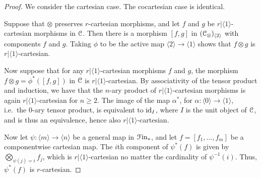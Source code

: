 \documentclass[main.tex]{subfiles}
\begin{document}
\begin{proof}
  We consider the cartesian case. The cocartesian case is identical.

  Suppose that $\otimes$ preserves $r$-cartesian morphisms, and let $f$ and $g$ be $r|\langle 1 \rangle$-cartesian morphisms in $\mathcal{C}$. Then there is a morphism $[f, g]$ in $( \mathcal{C}_{\otimes} )_{\langle 2 \rangle}$ with components $f$ and $g$. Taking $\phi$ to be the active map $\langle 2 \rangle \to \langle 1 \rangle$ shows that $f \otimes g$ is $r|\langle 1 \rangle$-cartesian.

  Now suppose that for any $r|\langle 1 \rangle$-cartesian morphisms $f$ and $g$, the morphism $f \otimes g = \phi^{*}([f, g])$ in $\mathcal{C}$ is $r|\langle 1 \rangle$-cartesian. By associativity of the tensor product and induction, we have that the $n$-ary product of $r|\langle 1 \rangle$-cartesian morphisms is again $r|\langle 1 \rangle$-cartesian for $n \geq 2$. The image of the map $\alpha^{*}$, for $\alpha\colon \langle 0 \rangle \to \langle 1 \rangle$, i.e.\ the 0-ary tensor product, is equivalent to $\mathrm{id}_{I}$, where $I$ is the unit object of $\mathcal{C}$, and is thus an equivalence, hence also $r|\langle 1 \rangle$-cartesian.

  Now let $\psi\colon \langle m \rangle \to \langle n \rangle$ be a general map in $\mathcal{F}\mathrm{in}_{*}$, and let $f = [f_{1}, \ldots, f_{m}]$ be a componentwise cartesian map. The $i$th component of $\psi^{*}(f)$ is given by $\bigotimes_{\psi(j) = i} f_{j}$, which is $r|\langle 1 \rangle$-cartesian no matter the cardinality of $\psi^{-1}(i)$. Thus, $\psi^{*}(f)$ is $r$-cartesian.
\end{proof}

\end{document}
